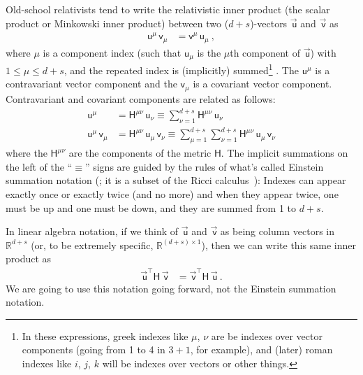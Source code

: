 \documentclass{article}
\newcommand{\metric}{\mathsf{H}}
\newcommand\upvec[1]{\!\vec{\,\mathrm{#1}}}
\newcommand{\Lvec}[1]{\upvec{\mathsf{#1}}} %
\newcommand{\Lblank}[1]{\mathsf{#1}} %
\newcommand{\plus}{\!+\!} %
\begin{document}
Old-school relativists tend to write the relativistic inner product (the scalar product or Minkowski inner product) between two ($d\plus s$)-vectors $\Lvec{u}$ and $\Lvec{v}$ as
\begin{align}
    \Lblank{u}^\mu\,\Lblank{v}_\mu &= \Lblank{v}^\mu\,\Lblank{u}_\mu ~,
\end{align}
where $\mu$ is a component index (such that $\Lblank{u}_\mu$ is the $\mu$th component of $\Lvec{u}$) with $1\leq\mu\leq d+s$, and the repeated index is (implicitly) summed\footnote{%
In these expressions, greek indexes like $\mu$, $\nu$ are be indexes over vector components (going from 1 to 4 in $3\plus1$, for example), and (later) roman indexes like $i$, $j$, $k$ will be indexes over vectors or other things.} .
The $\Lblank{u}^\mu$ is a contravariant vector component and the $\Lblank{v}_\mu$ is a covariant vector component.
Contravariant and covariant components are related as follows:
\begin{align}
    \Lblank{u}^\mu &= \metric^{\mu\nu}\,\Lblank{u}_\nu \equiv \sum_{\nu=1}^{d+s} \metric^{\mu\nu}\,\Lblank{u}_\nu
    \\
    \Lblank{u}^\mu\,\Lblank{v}_\mu &= \metric^{\mu\nu}\,\Lblank{u}_\mu\,\Lblank{v}_\nu \equiv \sum_{\mu=1}^{d+s}\sum_{\nu=1}^{d+s} \metric^{\mu\nu}\,\Lblank{u}_\mu\,\Lblank{v}_\nu
\end{align}
where the $\metric^{\mu\nu}$ are the components of the metric $\metric$.
The implicit summations on the left of the ``$\equiv$'' signs are guided by the rules of what's called Einstein summation notation (\cite{summation}; it is a subset of the Ricci calculus~\cite{ricci}): Indexes can appear exactly once or exactly twice (and no more) and when they appear twice, one must be up and one must be down, and they are summed from 1 to $d+s$.

In linear algebra notation, if we think of $\Lvec{u}$ and $\Lvec{v}$ as being column vectors in $\mathbb{R}^{d+s}$ (or, to be extremely specific, $\mathbb{R}^{(d+s)\times 1}$), then we can write this same inner product as
\begin{align}\label{eq:inner}
    \Lvec{u}^\top\metric\,\Lvec{v} &= \Lvec{v}^\top\metric\,\Lvec{u} ~.
\end{align}
We are going to use this notation going forward, not the Einstein summation notation.
\end{document}
